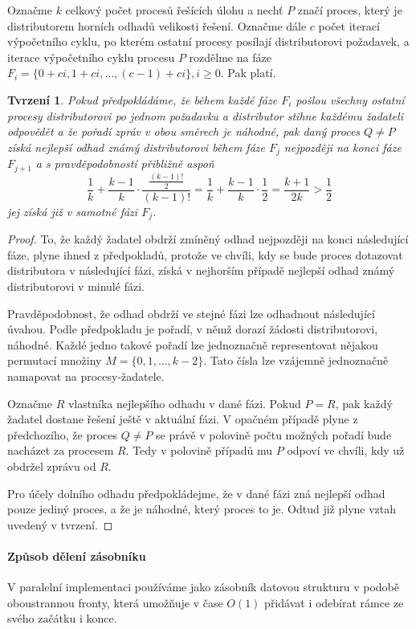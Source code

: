 \documentclass[12pt]{article}
\newtheorem{tvrz}{Tvrzení}
\theoremstyle{definition}
\begin{document}
	Označme $k$ celkový počet procesů řešících úlohu a nechť $P$ značí proces, který je distributorem horních
	odhadů velikosti řešení. Označme dále $c$ počet iterací výpočetního cyklu, po kterém ostatní
	procesy posílají distributorovi požadavek, a iterace výpočetního cyklu
	procesu $P$ rozdělme na fáze $F_i=\{0+ci, 1+ci, \dots, (c-1)+ci\},i\geq 0$.
	Pak platí.
\begin{tvrz}
	Pokud předpokládáme, že během každé fáze $F_i$ pošlou všechny ostatní procesy distributorovi po jednom požadavku a distributor stihne
	každému žadateli odpovědět a že pořadí zpráv v obou směrech je náhodné, pak
	daný proces $Q\neq P$ získá nejlepší odhad známý distributorovi během fáze $F_j$ nejpozději na konci fáze $F_{j+1}$ a
	s pravděpodobností přibližně aspoň
	$$\frac{1}{k}+\frac{k-1}{k}\cdot\frac{\frac{(k-1)!}{2}}{(k-1)!}=\frac{1}{k}+\frac{k-1}{k}\cdot\frac{1}{2}
	=\frac{k+1}{2k}>\frac{1}{2}$$
	jej získá již v samotné fázi $F_j$.
\end{tvrz}
\begin{proof}
	To, že každý žadatel obdrží zmíněný odhad nejpozději na konci následující fáze, plyne ihned z předpokladů, protože ve chvíli,
	kdy se bude proces dotazovat distributora v následující fázi, získá v nejhorším případě nejlepší odhad známý
	distributorovi v minulé fázi.
	
	Pravděpodobnost, že odhad obdrží ve stejné fázi lze odhadnout následující úvahou.
	Podle předpokladu je pořadí, v němž dorazí žádosti distributorovi, náhodné. Každé jedno takové pořadí
	lze jednoznačně representovat nějakou permutací množiny $M=\{0,1,\dots, k-2\}$. Tato čísla
	lze vzájemně jednoznačně namapovat na procesy-žadatele.
	
	Označme $R$ vlastníka nejlepšího odhadu v dané fázi. Pokud $P=R$, pak každý žadatel dostane řešení ještě
	v aktuální fázi. V opačném případě plyne z předchozího,
	že proces $Q\neq P$ se právě v polovině počtu možných pořadí bude nacházet za procesem $R$.
	Tedy v polovině případů mu $P$ odpoví ve chvíli, kdy už obdržel zprávu od $R$.
	
	Pro účely dolního odhadu předpokládejme, že v dané fázi zná nejlepší odhad pouze jediný proces, a že
	je náhodné, který proces to je. Odtud již plyne vztah uvedený v tvrzení.
\end{proof}

\paragraph{Způsob dělení zásobníku}
V paralelní implementaci používáme jako zásobník datovou strukturu v podobě oboustrannou fronty, která umožňuje v čase $O(1)$ přidávat i odebírat
rámce ze svého začátku i konce.
\end{document}
